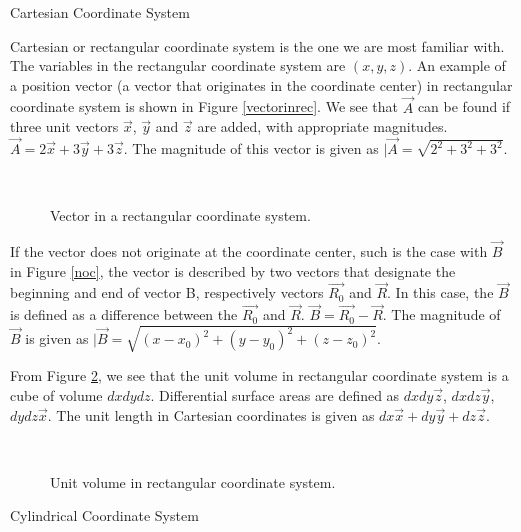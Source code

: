 \begin{description}
\item{Cartesian Coordinate System}

Cartesian or rectangular coordinate system is the one we are most familiar with. The variables in the rectangular coordinate system are $(x,y,z)$. An example of a position vector (a vector that originates in the coordinate center) in rectangular coordinate system is shown in Figure \ref{vectorinrec}. We see that $\vec{A}$ can be found if three unit vectors $\vec{x}$, $\vec{y}$ and $\vec{z}$ are added, with appropriate magnitudes. $\vec{A} = 2 \vec{x} +3 \vec{y}+ 3 \vec{z}  $. The magnitude of this vector is given as $|\vec{A} = \sqrt{2^2+3^2+3^2}$. 

\begin{figure}[htbp]
\begin{center}
\strut{} \\
\end{center}
\caption{Vector in a rectangular coordinate system.}
\label{vectorirec}
\end{figure}


If the vector does not originate at the coordinate center, such is the case with $\vec{B}$ in Figure \ref{noc}, the vector is described by two vectors that designate the beginning and end of vector B, respectively vectors $\vec{R_0}$ and $\vec{R}$. In this case, the $\vec{B}$ is defined as a difference between the $\vec{R_0}$ and $\vec{R}$. $\vec{B}=\vec{R_0}-\vec{R}$. The magnitude of $\vec{B}$ is given as $|\vec{B} = \sqrt{(x-x_0)^2+(y-y_0)^2+(z-z_0)^2}$.

From Figure \ref{reccs}, we see that the unit volume in rectangular coordinate system is a cube of volume $dx dy dz$. Differential surface areas are defined as $dx dy \vec{z}$, $dx dz \vec{y}$, $dy dz \vec{x}$. The unit length in Cartesian coordinates is given as $dx \vec{x} + dy \vec{y} + dz \vec{z}$.

\begin{figure}[htbp]
\begin{center}
\strut{} \\
\end{center}
\caption{Unit volume in rectangular coordinate system.}
\label{reccs}
\end{figure}





\item{Cylindrical Coordinate System}


\end{description}
